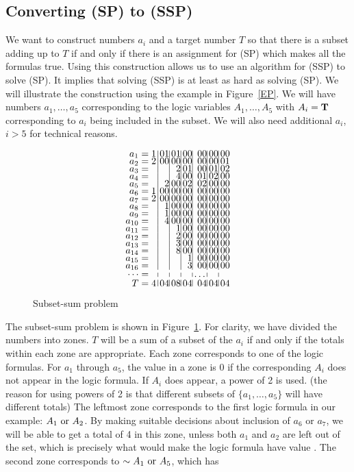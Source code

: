 \subsection{Converting (SP) to (SSP)}\label{SSP}
We want to construct numbers $a_i$ and a target number $T$ so that
there is a subset adding up to $T$ if and only if there is an
assignment for (SP) which makes all the formulas
true.  Using this construction allows us to use an algorithm for
(SSP) to solve (SP).  It implies that solving (SSP) is at least as
hard as solving (SP).
\pq We will illustrate the construction using the example in
Figure~\ref{EP}.  We will have numbers $a_1,\dots,a_5$
corresponding to the logic variables $A_1,\dots,A_5$ with 
$A_i={\bf T}$ corresponding to $a_i$ being included in the subset.
We will also need additional $a_i$, $i>5$ for technical reasons.
\begin{figure}[ht]$$\vbox{\offinterlineskip
\halign{\hfil$#{}$&$\hfil#\,$&&\vrule#
&\hfil$\,#$\cr a_1=&1&&01&&01&&00&&00&&00&&00\cr a_2=&2&&00&&00&&00&&00
&&00&&01\cr a_3=&&&&&2&&01&&00&&01&&02\cr a_4=&&&&&4&&00&&01&&02
&&00\cr a_5=&&&2&&00&&02&&02&&00&&00\cr a_6=&1&&00&&00&&00&&00&&00&&00\cr
a_7=&2&&00&&00&&00&&00&&00&&00\cr
a_8=&&&1&&00&&00&&00&&00&&00\cr a_{9}=&&&1&&00&&00&&00&&00&&00\cr
a_{10}=&&&4&&00&&00&&00&&00&&00\cr a_{11}=&&&&&1&&00&&00&&00&&00\cr
 a_{12}=&&&&&2&&00&&00&&00&&00\cr a_{13}=&&&&&3&&00&&00&&00&&00\cr
 a_{14}=&&&&&8&&00&&00&&00&&00\cr a_{15}=&&&&&&&1&&00&&00&&00\cr
 a_{16}=&&&&&&&3&&00&&00&&00\cr\noalign{\smallskip}
\dots=&&&&&&&&&\dots&&&&\cr \noalign{\smallskip}
T=&4&&04&&08&&04&&04&&04&&04\cr}}$$
\caption{\label{UGH}Subset-sum problem}
\end{figure}
\pq The subset-sum problem is shown in Figure~\ref{UGH}.
For clarity, we have divided the numbers into zones. $T$ will be a
sum of a
subset of the $a_i$ if and only if the totals within each zone
are appropriate.
Each zone corresponds to one of the logic formulas. 
For $a_1$ through $a_5$, the value in a zone is 0 if the corresponding
$A_i$ does not appear in the logic formula.  If $A_i$ does appear,
a power of 2 is used. (the reason for using powers of 2 is that
different subsets of $\{a_1,\dots,a_5\}$ will have different totals)
\pq The leftmost zone corresponds to the first logic formula in 
our example: $A_1\hbox{ or } A_2$.  By making suitable
decisions about inclusion of $a_6$ or $a_7$, we will be able to get
a total of 4 in this zone, unless both $a_1$ and $a_2$ are left
out of the set, which is precisely what would make the logic formula
have value \F.
\pq The second zone corresponds to $\sim A_1\hbox{ or } A_5$, which has
